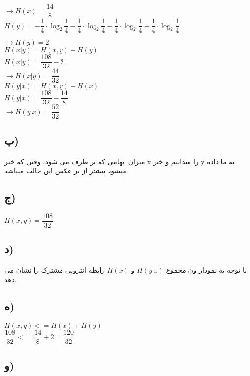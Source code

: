 \null \hfill $ \rightarrow H(x) = \dfrac{14}{8} $ \\

\null \hfill $ H(y) = - \dfrac{1}{4} \cdot \log_{2} \dfrac{1}{4} - \dfrac{1}{4} \cdot \log_{2} \dfrac{1}{4} - \dfrac{1}{4} \cdot \log_{2} \dfrac{1}{4} - \dfrac{1}{4} \cdot \log_{2} \dfrac{1}{4} $

\null \hfill $ \rightarrow H(y) = 2 $ \\


\null \hfill $ H(x|y) = H(x,y) - H(y) $ \\
\null \hfill $ H(x|y) = \dfrac{108}{32} - 2 $ \\
\null \hfill $ \rightarrow H(x|y) = \dfrac{44}{32} $ \\

\null \hfill $ H(y|x) = H(x,y) - H(x) $ \\
\null \hfill $ H(y|x) = \dfrac{108}{32} - \dfrac{14}{8} $ \\
\null \hfill $ \rightarrow H(y|x) = \dfrac{52}{32} $ \\


\subsection{ب)}
میزان ابهامی که بر طرف می شود، وقتی که خبر 
x
را میدانیم و خبر 
y 
به ما داده میشود بیشتر از بر عکس این حالت میباشد.


\subsection{ج)}
\null \hfill $H(x,y) = \dfrac{108}{32} $ \\


\subsection{د)}
با توجه به نمودار ون مجموع 
 \(H(y|x)\)
و
 \(H(x)\)
رابطه انتروپی مشترک را نشان می دهد.



\subsection{ه)}
\null \hfill $ H(x,y) <= H(x) + H(y) $ \\
\null \hfill $ \dfrac{108}{32} <= \dfrac{14}{8} + 2 = \dfrac{120}{32}$ \\


\subsection{و)}

